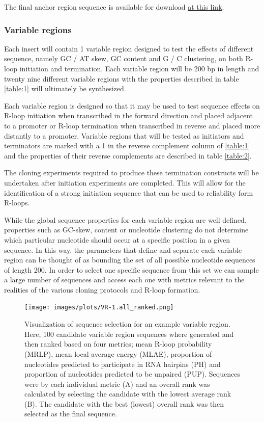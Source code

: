 \documentclass[11pt]{article}
\begin{document}
The final anchor region sequence is available for download \href{}{at this link}.

\subsubsection{Variable regions}

Each insert will contain 1 variable region designed to test the effects of different sequence, namely GC / AT skew, GC content and G / C clustering, on both R-loop initiation and termination. Each variable region will be 200 bp in length and twenty nine different variable regions with the properties described in table \ref{table:1} will ultimately be synthesized. 



Each variable region is designed so that it may be used to test sequence effects on R-loop initiation when transcribed in the forward direction and placed adjacent to a promoter or R-loop termination when transcribed in reverse and placed more distantly to a promoter. Variable regions that will be tested as initiators and terminators are marked with a 1 in the reverse complement column of \ref{table:1} and the properties of their reverse complements are described in table \ref{table:2}. 



The cloning experiments required to produce these termination constructs will be undertaken after initiation experiments are completed. This will allow for the identification of a strong initiation sequence that can be used to reliability form R-loops. 



While the global sequence properties for each variable region are well defined, properties such as GC-skew, content or nucleotide clustering do not determine which particular nucleotide should occur at a specific position in a given sequence. In this way, the parameters that define and separate each variable region can be thought of as bounding the set of all possible nucleotide sequences of length 200. In order to select one specific sequence from this set we can sample a large number of sequences and access each one with metrics relevant to the realities of the various cloning protocols and R-loop formation. 

\begin{figure}[H]
	\texttt{[image: images/plots/VR-1.all\_ranked.png]}
	\centering
	\caption{Visualization of sequence selection for an example variable region. Here, 100 candidate variable region sequences where generated and then ranked based on four metrics; mean R-loop probability (MRLP), mean local average energy (MLAE), proportion of nucleotides predicted to participate in RNA hairpins (PH) and proportion of nucleotides predicted to be unpaired (PUP). Sequences were by each individual metric (A) and an overall rank was calculated by selecting the candidate with the lowest average rank (B). The candidate with the best (lowest) overall rank was then selected as the final sequence.}
	\label{ranking}
\end{figure}
\end{document}
